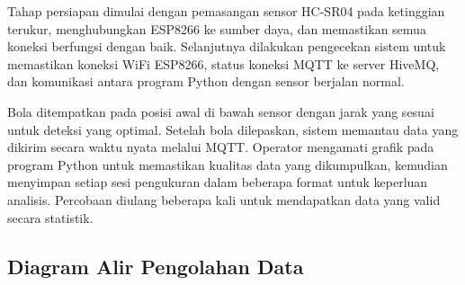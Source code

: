Tahap persiapan dimulai dengan pemasangan sensor HC-SR04 pada ketinggian terukur, menghubungkan ESP8266 ke sumber daya, dan memastikan semua koneksi berfungsi dengan baik. Selanjutnya dilakukan pengecekan sistem untuk memastikan koneksi WiFi ESP8266, status koneksi MQTT ke server HiveMQ, dan komunikasi antara program Python dengan sensor berjalan normal.

Bola ditempatkan pada posisi awal di bawah sensor dengan jarak yang sesuai untuk deteksi yang optimal. Setelah bola dilepaskan, sistem memantau data yang dikirim secara waktu nyata melalui MQTT. Operator mengamati grafik pada program Python untuk memastikan kualitas data yang dikumpulkan, kemudian menyimpan setiap sesi pengukuran dalam beberapa format untuk keperluan analisis. Percobaan diulang beberapa kali untuk mendapatkan data yang valid secara statistik.

\newpage

\subsection{Diagram Alir Pengolahan Data}

